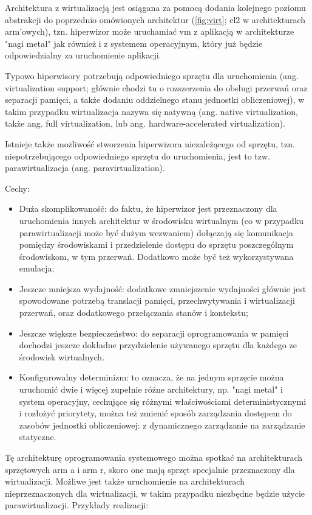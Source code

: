 \documentclass[../../main]{subfiles}
\begin{document}
Architektura z wirtualizacją jest osiągana za pomocą dodania kolejnego poziomu abstrakcji do
poprzednio omówionych architektur (\cref{fig:virt}; \acrshort{el}2 w architekturach
\acrshort{arm}'owych), tzn. hiperwizor może uruchamiać \acrshort{vm} z aplikacją w architekturze "nagi
metał" jak również i z systemem operacyjnym, który już będzie odpowiedzialny za uruchomienie aplikacji.

Typowo hiperwisory potrzebują odpowiedniego sprzętu dla uruchomienia (ang. virtualization support;
głównie chodzi tu o rozszerzenia do obsługi przerwań oraz separacji pamięci, a także dodaniu
oddzielnego stanu jednostki obliczeniowej), w takim przypadku wirtualizacja nazywa się natywną (ang.
native virtualization, także ang. full virtualization, lub ang. hardware-accelerated virtualization).

Istnieje także możliwość stworzenia hiperwizora niezależącego od sprzętu, tzn. niepotrzebującego
odpowiedniego sprzętu do uruchomienia, jest to tzw. parawirtualizacja (ang. paravirtualization).

Cechy:
\begin{itemize}
    \item Duża skomplikowaność: do faktu, że hiperwizor jest przeznaczony dla uruchomienia innych
    architektur w środowisku wirtualnym (co w przypadku parawirtualizacji może być dużym wezwaniem)
    dołączają się komunikacja pomiędzy środowiskami i przedzielenie dostępu do sprzętu poszczególnym
    środowiskom, w tym przerwań. Dodatkowo może być też wykorzystywana emulacja;
    \item Jeszcze mniejsza wydajność: dodatkowe zmniejszenie wydajności głównie jest spowodowane
    potrzebą translacji pamięci, przechwytywania i wirtualizacji przerwań, oraz dodatkowego
    przełączania stanów i kontekstu;
    \item Jeszcze większe bezpieczeństwo: do separacji oprogramowania w pamięci dochodzi jeszcze
    dokładne przydzielenie używanego sprzętu dla każdego ze środowisk wirtualnych.
    \item Konfigurowalny determinizm: to oznacza, że na jednym sprzęcie można uruchomić dwie i więcej
    zupełnie różne architektury, np. "nagi metal" i system operacyjny, cechujące się różnymi
    właściwościami deterministycznymi i rozłożyć priorytety, można też zmienić sposób zarządzania
    dostępem do zasobów jednostki obliczeniowej: z dynamicznego zarządzanie na zarządzanie statyczne.
\end{itemize}

Tę architekturę oprogramowania systemowego można spotkać na architekturach sprzętowych \acrshort{arm}
\acrshort{a} i \acrshort{arm} \acrshort{r}, skoro one mają sprzęt specjalnie przeznaczony dla
wirtualizacji. Możliwe jest także uruchomienie na architekturach nieprzeznaczonych dla wirtualizacji,
w takim przypadku niezbędne będzie użycie parawirtualizacji. Przykłady realizacji:
\end{document}
